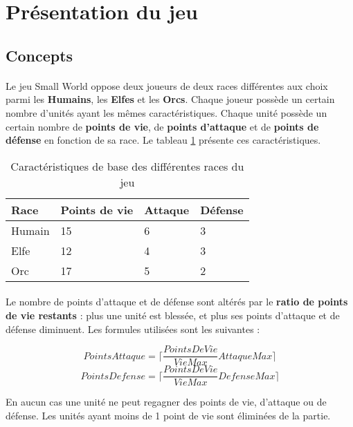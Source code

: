 \section{Présentation du jeu}

\subsection{Concepts}

\paragraph{}
Le jeu Small World oppose deux joueurs de deux races différentes aux choix parmi les \textbf{Humains}, les \textbf{Elfes} et les \textbf{Orcs}.
Chaque joueur possède un certain nombre d'unités ayant les mêmes caractéristiques. Chaque unité possède un certain nombre de \textbf{points de vie}, de \textbf{points d'attaque} et de \textbf{points de défense} en fonction de sa race.
Le tableau \ref{fig:caracteristiques} présente ces caractéristiques.

\begin{table}[h!]
  \centering
  \begin{tabular}{|l|l|l|l|}
    \hline
    Race&Points de vie&Attaque&Défense\\
    \hline
    Humain&15&6&3\\
    \hline
    Elfe&12&4&3\\
    \hline
    Orc&17&5&2\\
    \hline
  \end{tabular}
  \caption{Caractéristiques de base des différentes races du jeu}
  \label{fig:caracteristiques}
\end{table}

\paragraph{}
Le nombre de points d'attaque et de défense sont altérés par le \textbf{ratio de points de vie restants} : plus une unité est blessée, et plus ses points d'attaque et de défense diminuent. Les formules utilisées sont les suivantes :

\begin{displaymath}
  PointsAttaque = \lceil \frac{PointsDeVie}{VieMax} AttaqueMax \rceil
\end{displaymath}
\begin{displaymath}
  PointsDefense = \lceil \frac{PointsDeVie}{VieMax} DefenseMax \rceil
\end{displaymath}

En aucun cas une unité ne peut regagner des points de vie, d'attaque ou de défense. Les unités ayant moins de 1 point de vie sont éliminées de la partie.

\paragraph{}

